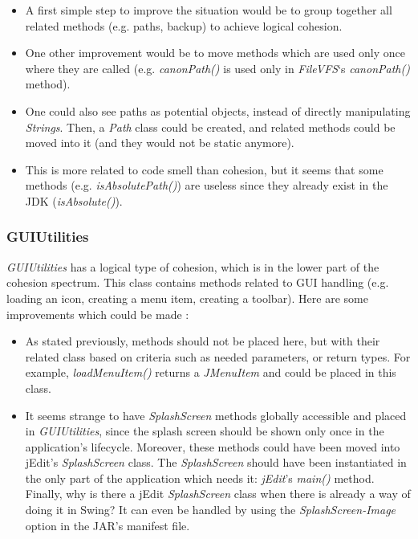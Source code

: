 \begin{itemize}\itemsep1pt
    \item A first simple step to improve the situation would be to group
    together all related methods (e.g. paths, backup) to achieve logical
    cohesion.

    \item One other improvement would be to move methods which are used only
    once where they are called (e.g. \emph{canonPath()} is used only in
    \emph{FileVFS}`s \emph{canonPath()} method).

    \item One could also see paths as potential objects, instead of directly
    manipulating \emph{Strings}. Then, a \emph{Path} class could be
    created, and related methods could be moved into it (and they would
    not be static anymore).

    \item This is more related to code smell than cohesion, but it seems that
    some methods (e.g. \emph{isAbsolutePath()}) are useless since they
    already exist in the JDK (\emph{isAbsolute()}).
\end{itemize}

\subsubsection{GUIUtilities}

\emph{GUIUtilities} has a logical type of cohesion, which is in the
lower part of the cohesion spectrum. This class contains methods related
to GUI handling (e.g. loading an icon, creating a menu item, creating a
toolbar). Here are some improvements which could be made :

\begin{itemize}\itemsep1pt
    \item As stated previously, methods should not be placed here, but with
    their related class based on criteria such as needed parameters, or return
    types. For example, \emph{loadMenuItem()} returns a \emph{JMenuItem} and
    could be placed in this class.

    \item It seems strange to have \emph{SplashScreen} methods globally
    accessible and placed in \emph{GUIUtilities}, since the splash screen
    should be shown only once in the application's lifecycle. Moreover,
    these methods could have been moved into jEdit's \emph{SplashScreen}
    class. The \emph{SplashScreen} should have been instantiated in the
    only part of the application which needs it: \emph{jEdit}'s
    \emph{main()} method. Finally, why is there a jEdit
    \emph{SplashScreen} class when there is already a way of doing it in
    Swing? It can even be handled by using the \emph{SplashScreen-Image}
    option in the JAR's manifest file. \cite{cite:swingSplash}
\end{itemize}

